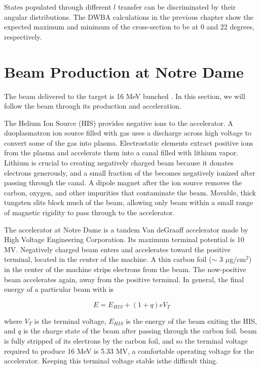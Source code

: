 States populated through different $l$ transfer can be discriminated by their angular distributions.  The DWBA calculations in the previous chapter show the expected maximum and minimum of the \zp cross-section to be at 0 and 22 degrees, respectively. 


\section{Beam Production at Notre Dame}
The beam delivered to the target is 16 MeV bunched .  In this section, we will follow the beam through its production and acceleration.

The Helium Ion Source (HIS) provides negative  ions to the accelerator.  A duoplasmatron ion source filled with  gas uses a discharge across high voltage to convert some of the gas into plasma.  Electrostatic elements extract positive  ions from the plasma and accelerate them into a canal filled with lithium vapor.  Lithium is crucial to creating negatively charged beam because it donates electrons generously, and a small fraction of the  becomes negatively ionized after passing through the canal.  A dipole magnet after the ion source removes the carbon, oxygen, and other impurities that contaminate the  beam.  Movable, thick tungsten slits block much of the beam, allowing only beam within a small range of magnetic rigidity to pass through to the accelerator.

The accelerator at Notre Dame is a tandem Van deGraaff accelerator made by High Voltage Engineering Corporation.  Its maximum terminal potential is 10 MV.  Negatively charged beam enters and accelerates toward the positive terminal, located in the center of the machine. A thin carbon foil ($\sim$ 3 $\mu$g/cm$^2$) in the center of the machine strips electrons from the beam.  The now-positive beam accelerates again, away from the positive terminal. In general, the final energy of a particular beam with is 

\begin{equation}
E = E_{HIS} + (1+q)eV_T
\end{equation}

where $V_T$ is the terminal voltage, $E_{HIS}$ is the energy of the beam exiting the HIS, and $q$ is the charge state of the beam after passing through the carbon foil.   beam is fully stripped of its electrons by the carbon foil, and so the terminal voltage required to produce 16 MeV  is 5.33 MV, a comfortable operating voltage for the accelerator.  Keeping this terminal voltage stable isthe difficult thing.  

